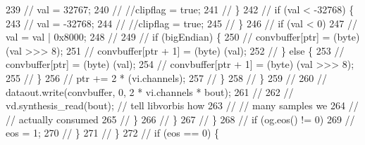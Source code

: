 \begin{DoxyCode}
239 \textcolor{comment}{//                                              val = 32767;}
240 \textcolor{comment}{//                                              //clipflag = true;}
241 \textcolor{comment}{//                                          \}}
242 \textcolor{comment}{//                                          if (val < -32768) \{}
243 \textcolor{comment}{//                                              val = -32768;}
244 \textcolor{comment}{//                                              //clipflag = true;}
245 \textcolor{comment}{//                                          \}}
246 \textcolor{comment}{//                                          if (val < 0)}
247 \textcolor{comment}{//                                              val = val | 0x8000;}
248 \textcolor{comment}{//              }
249 \textcolor{comment}{//                                          if (bigEndian) \{}
250 \textcolor{comment}{//                                              convbuffer[ptr] = (byte) (val >>> 8);}
251 \textcolor{comment}{//                                              convbuffer[ptr + 1] = (byte) (val);}
252 \textcolor{comment}{//                                          \} else \{}
253 \textcolor{comment}{//                                              convbuffer[ptr] = (byte) (val);}
254 \textcolor{comment}{//                                              convbuffer[ptr + 1] = (byte) (val >>> 8);}
255 \textcolor{comment}{//                                          \}}
256 \textcolor{comment}{//                                          ptr += 2 * (vi.channels);}
257 \textcolor{comment}{//                                      \}}
258 \textcolor{comment}{//                                  \}}
259 \textcolor{comment}{//}
260 \textcolor{comment}{//                                  dataout.write(convbuffer, 0, 2 * vi.channels * bout);}
261 \textcolor{comment}{//}
262 \textcolor{comment}{//                                  vd.synthesis\_read(bout); // tell libvorbis how}
263 \textcolor{comment}{//                                  // many samples we}
264 \textcolor{comment}{//                                  // actually consumed}
265 \textcolor{comment}{//                              \}}
266 \textcolor{comment}{//                          \}}
267 \textcolor{comment}{//                      \}}
268 \textcolor{comment}{//                      if (og.eos() != 0)}
269 \textcolor{comment}{//                          eos = 1;}
270 \textcolor{comment}{//                  \}}
271 \textcolor{comment}{//              \}}
272 \textcolor{comment}{//              if (eos == 0) \{}

\end{DoxyCode}
